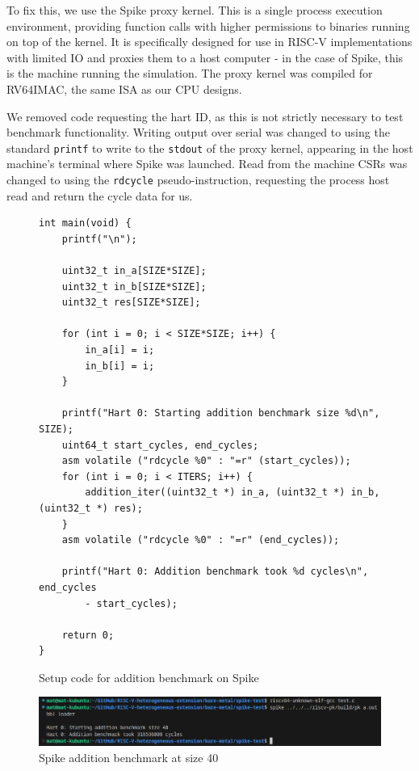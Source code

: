To fix this, we use the Spike proxy kernel. This is a single process execution environment, providing function calls with higher permissions to binaries running on top of the kernel. It is specifically designed for use in RISC-V implementations with limited IO and proxies them to a host computer - in the case of Spike, this is the machine running the simulation. The proxy kernel was compiled for RV64IMAC, the same ISA as our CPU designs.

We removed code requesting the hart ID, as this is not strictly necessary to test benchmark functionality. Writing output over serial was changed to using the standard \texttt{printf} to write to the \texttt{stdout} of the proxy kernel, appearing in the host machine's terminal where Spike was launched. Read from the machine CSRs was changed to using the \texttt{rdcycle} pseudo-instruction, requesting the process host read and return the cycle data for us.

\begin{figure}[h!]
    \centering
    \begin{verbatim}
int main(void) {
    printf("\n");

    uint32_t in_a[SIZE*SIZE];
    uint32_t in_b[SIZE*SIZE];
    uint32_t res[SIZE*SIZE];

    for (int i = 0; i < SIZE*SIZE; i++) {
        in_a[i] = i;
        in_b[i] = i;
    }

    printf("Hart 0: Starting addition benchmark size %d\n", SIZE);
    uint64_t start_cycles, end_cycles;
    asm volatile ("rdcycle %0" : "=r" (start_cycles));
    for (int i = 0; i < ITERS; i++) {
        addition_iter((uint32_t *) in_a, (uint32_t *) in_b, (uint32_t *) res);
    }
    asm volatile ("rdcycle %0" : "=r" (end_cycles));

    printf("Hart 0: Addition benchmark took %d cycles\n", end_cycles 
        - start_cycles);

    return 0;
}
    \end{verbatim}
    \caption{Setup code for addition benchmark on Spike}
    \label{fig:spike-setup-code}
\end{figure}

\begin{figure}
    \centering
    \includegraphics[width=\textwidth]{img/spike_output.png}
    \caption{Spike addition benchmark at size 40}
    \label{fig:spike_test_output}
\end{figure}

